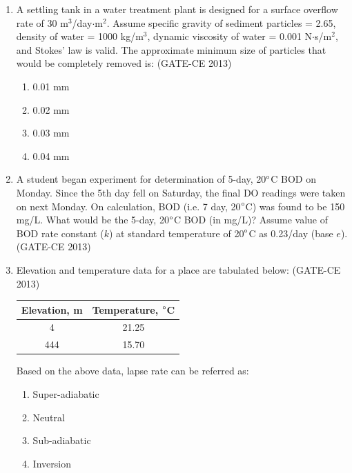 \documentclass[journal,12pt,onecolumn]{article}
\theoremstyle{remark}
\begin{document}
\begin{enumerate}
    \item A settling tank in a water treatment plant is designed for a surface overflow rate of 30 m$^3$/day$\cdot$m$^2$. Assume specific gravity of sediment particles = 2.65, density of water \brak{\rho} = 1000 kg/m$^3$, dynamic viscosity of water \brak{\mu} = 0.001 N$\cdot$s/m$^2$, and Stokes' law is valid. The approximate minimum size of particles that would be completely removed is: (GATE-CE 2013)
    \begin{multicols}{4}
    \begin{enumerate}
        \item 0.01 mm 
        \item 0.02 mm 
        \item 0.03 mm 
        \item 0.04 mm
    \end{enumerate}
    \end{multicols}
    
    \item A student began experiment for determination of 5-day, 20$\degree$C BOD on Monday. Since the 5th day fell on Saturday, the final DO readings were taken on next Monday. On calculation, BOD (i.e. 7 day, 20$\degree$C) was found to be 150 mg/L. What would be the 5-day, 20$\degree$C BOD (in mg/L)? Assume value of BOD rate constant ($k$) at standard temperature of 20$\degree$C as 0.23/day (base $e$). \underline{\hspace{3cm}} (GATE-CE 2013)
    
    \item Elevation and temperature data for a place are tabulated below: (GATE-CE 2013)
    
    \begin{table}[H]
    \centering
    \begin{tabular}{|c|c|}
    \hline
    Elevation, m & Temperature, $\degree$C \\
    \hline
    4 & 21.25 \\
    444 & 15.70 \\
    \hline
    \end{tabular}
    \end{table}
    
    
    Based on the above data, lapse rate can be referred as:
    \begin{multicols}{2}
    \begin{enumerate}
        \item Super-adiabatic 
        \item Neutral 
        \item Sub-adiabatic 
        \item Inversion
    \end{enumerate}
    \end{multicols}
    

\end{enumerate}
\end{document}
